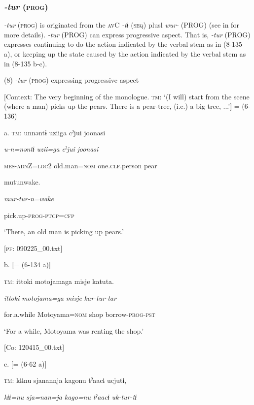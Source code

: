 \subsubsection{\textit{{}-tur} (\textsc{prog})}

\textit{{}-tur} (\textsc{prog}) is originated from the \textsc{av}C \textit{{}-tɨ} (\textsc{seq}) plusl \textit{wur-} (PROG) (see  in  for more details). \textit{{}-tur} (PROG) can express progressive aspect. That is, \textit{{}-tur} (PROG) expresses continuing to do the action indicated by the verbal stem as in (8-135 a), or keeping up the state caused by the action indicated by the verbal stem as in (8-135 b-c).

(8)  \textit{{}-tur} (\textsc{prog}) expressing progressive aspect

  [Context: The very beginning of the monologue. \textsc{tm}: ‘(I will) start from the scene (where a man) picks up the pears. There is a pear-tree, (i.e.) a big tree, ...’] = (6-136)

  a.  \textsc{tm}:  unnəntɨ  uziiga  cˀjui  joonasi

      \textit{u-n=nəntɨ}  \textit{uzii=ga}  \textit{cˀjui}  \textit{joonasi}

      \textsc{mes}-\textsc{adn}Z=\textsc{loc}2  old.man=\textsc{nom}  one.\textsc{clf}.person  pear

      mutunwake.

      \textit{mur-tur{}-n=wake}

      pick.up-\textsc{prog}-\textsc{ptcp}=\textsc{cfp}

      ‘There, an old man is picking up pears.’

      [\textsc{pf}: 090225\_00.txt]

  b.  [= (6-134 a)]

    \textsc{tm}:  {\textbar}ittoki{\textbar}  motojamaga  misje  katuta.

      \textit{ittoki}  \textit{motojama=ga}  \textit{misje}  \textit{kar-tur{}-tar}

      for.a.while  Motoyama=\textsc{nom}  shop  borrow-\textsc{prog}-\textsc{pst}

      ‘For a while, Motoyama was renting the shop.’

      [Co: 120415\_00.txt]

  c.  [= (6-62 a)]

    \textsc{tm}:  kɨɨnu  sjanannja  kagonu  tˀaacɨ  ucjutɨ,

      \textit{kɨɨ=nu}  \textit{sja=nan=ja}  \textit{kago=nu}  \textit{tˀaacɨ}  \textit{uk-tur{}-tɨ}


